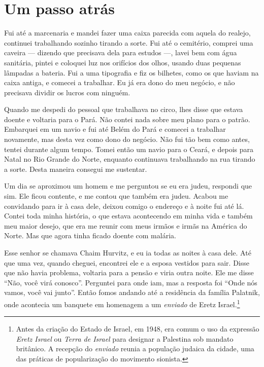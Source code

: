 \chapter{Um passo atrás}

Fui até a marcenaria e mandei fazer uma caixa parecida com aquela do
realejo, continuei trabalhando sozinho tirando a sorte. Fui até o
cemitério, comprei uma caveira --- dizendo que precisava dela para estudos  ---,
lavei bem com água sanitária, pintei e coloquei luz nos orifícios dos
olhos, usando duas pequenas lâmpadas a bateria. Fui a uma tipografia e
fiz os bilhetes, como os que haviam na caixa antiga, e comecei a trabalhar. Eu
já era dono do meu negócio, e não precisava dividir os lucros com
ninguém.

Quando me despedi do pessoal que trabalhava no circo, lhes disse que
estava doente e voltaria para o Pará. Não contei nada sobre meu plano
para o patrão. Embarquei em um navio e fui até Belém do Pará e comecei a
trabalhar novamente, mas desta vez como dono do negócio. Não fui tão bem 
como antes, tentei durante algum tempo. Tomei então um navio para o 
Ceará, e depois para Natal no Rio Grande do Norte, enquanto continuava
trabalhando na rua tirando a sorte. Desta maneira consegui me
sustentar.

Um dia se aproximou um homem e me perguntou se eu era judeu, respondi
que sim. Ele ficou contente, e me contou que também era judeu. Acabou me
convidando para ir à casa dele, deixou comigo o endereço e à noite fui até lá.
Contei toda minha história, o que estava acontecendo em minha vida e
também meu maior desejo, que era me reunir com meus irmãos e irmãs na América
do Norte. Mas que agora tinha ficado doente com malária. 

Esse senhor se chamava Chaim Hurvitz, e eu ia todas as noites à casa dele. Até que uma vez, quando cheguei, encontrei ele e a esposa vestidos para sair. Disse que não havia problema, voltaria para a pensão e viria outra noite. Ele me disse ``Não, você virá conosco''. Perguntei para onde iam, mas a resposta foi ``Onde nós vamos, você vai junto''. Então fomos andando até a residência da família Palatnik, onde acontecia um banquete em homenagem a um \textit{enviado} de Eretz Israel.\footnote{Antes da criação do Estado de Israel, em 1948, era comum o uso da expressão \textit{Eretz Israel} ou \textit{Terra de Israel} para designar a Palestina sob mandato britânico. A recepção do \textit{enviado} reunia a população judaica da cidade, uma das práticas de popularização do movimento sionista.} 

